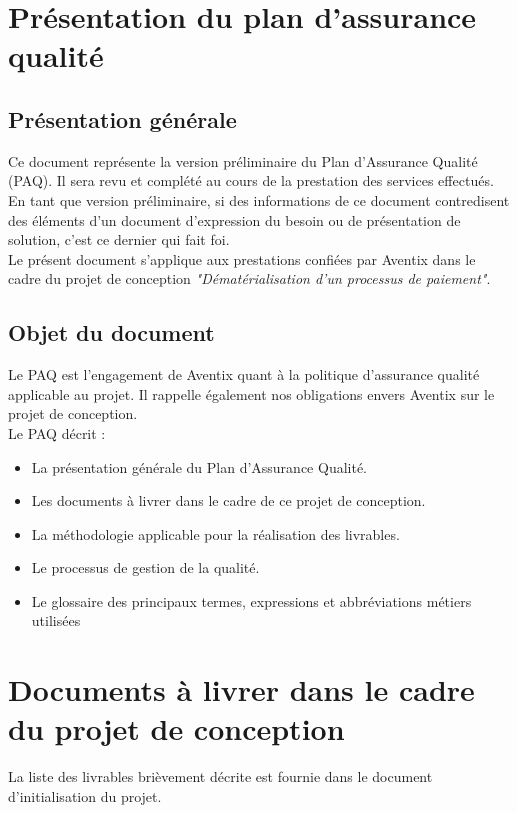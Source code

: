 




\section{Présentation du plan d'assurance qualité}
\subsection{Présentation générale}
Ce document représente la version préliminaire du Plan d'Assurance Qualité
(PAQ). Il sera revu et complété au cours de la prestation des services
effectués. \\

En tant que version préliminaire, si des informations de ce document
contredisent des éléments d'un document d'expression du besoin ou de
présentation de solution, c'est ce dernier qui fait foi. \\

Le présent document s'applique aux prestations confiées par Aventix dans le
cadre du projet de conception \textit{"Dématérialisation d'un processus de
paiement"}. \\

\subsection{Objet du document}
Le PAQ est l'engagement de Aventix quant à la politique d'assurance qualité
applicable au projet.
Il rappelle également nos obligations envers Aventix sur le projet de conception.
\\

Le PAQ décrit :
\begin{itemize}
  \item La présentation générale du Plan d'Assurance Qualité.
  \item Les documents à livrer dans le cadre de ce projet de conception.
  \item La méthodologie applicable pour la réalisation des livrables.
  \item Le processus de gestion de la qualité.
  \item Le glossaire des principaux termes, expressions et abbréviations
    métiers utilisées
\end{itemize}

\section{Documents à livrer dans le cadre du projet de conception}
La liste des livrables brièvement décrite est fournie dans le document
d'initialisation du projet. \\

